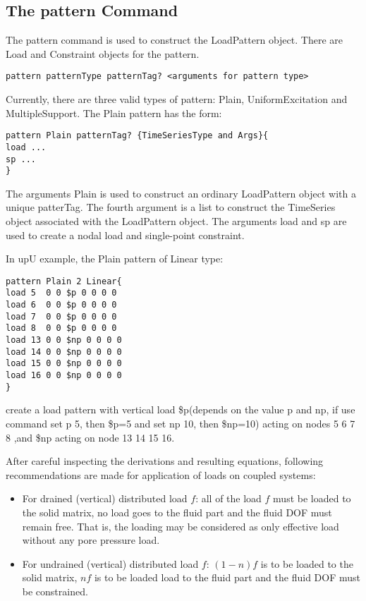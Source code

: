 \subsection{The pattern Command}
\label{The pattern Command}
The pattern command is used to construct the LoadPattern object. There are Load and Constraint
objects for the pattern.
\begin{verbatim}
pattern patternType patternTag? <arguments for pattern type>
\end{verbatim}
Currently, there are three valid types of pattern: Plain, UniformExcitation and MultipleSupport.
The Plain pattern has the form:
\begin{verbatim}
pattern Plain patternTag? {TimeSeriesType and Args}{
load ...
sp ...
}
\end{verbatim}
The arguments Plain is used to construct an ordinary LoadPattern object with a unique
patterTag. The fourth argument is a list to construct the TimeSeries object associated
with the LoadPattern object. The arguments load and sp are used to create a nodal
load and single-point constraint.

In upU example, the Plain pattern of Linear type:
\begin{verbatim}
pattern Plain 2 Linear{
load 5  0 0 $p 0 0 0 0
load 6  0 0 $p 0 0 0 0
load 7  0 0 $p 0 0 0 0
load 8  0 0 $p 0 0 0 0
load 13 0 0 $np 0 0 0 0
load 14 0 0 $np 0 0 0 0
load 15 0 0 $np 0 0 0 0
load 16 0 0 $np 0 0 0 0
}

\end{verbatim}
create a load pattern with vertical load \$p(depends on the value p and np, if use command
set p 5, then \$p=5 and set np 10, then \$np=10) acting on nodes 5 6 7 8 ,and \$np acting
on node 13 14 15 16.


After  careful  inspecting  the  derivations  and resulting equations, following
recommendations are made for application of loads on coupled systems:

\begin{itemize}
 \item  For drained (vertical) distributed load $f$: all of the load $f$ must be
 loaded  to  the  solid matrix, no load goes to the fluid part and the fluid DOF
 must    remain   free. That is, the loading may be considered as only effective
 load without any  pore pressure load.


 \item  For undrained (vertical) distributed load $f$:
 $(1-n) f$ is to be loaded to the solid matrix, $n f$ is to be loaded load to the fluid part and
 the fluid DOF must be  constrained. 
 
\end{itemize}


